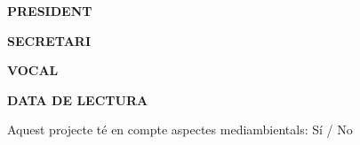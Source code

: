 \begin{titlepage}
\begin{center}
{\begin{tcolorbox}
                \begin{minipage}[t]{0.33\textwidth}
                    \centering\textbf{PRESIDENT}
                \end{minipage}
                \begin{minipage}[t]{0.33\textwidth}
                    \centering\textbf{SECRETARI}
                \end{minipage}%
                \begin{minipage}[t]{0.33\textwidth}
                    \centering\textbf{VOCAL}
                \end{minipage}%

                \vspace{1.75cm}
                \centering
                \textbf{DATA DE LECTURA}
                \vspace{1cm}
            \end{tcolorbox}
        }

        \vspace{0.75cm}
        Aquest projecte té en compte aspectes mediambientals: Sí / No

    \end{center}
\end{titlepage}
